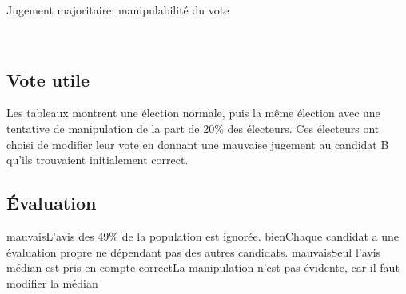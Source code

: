 \documentclass[../report]{subfiles}
\begin{document}
  \begin{table}[H]
    \begin{center}
      \caption{Jugement majoritaire: manipulabilité du vote}%
      \label{fig:diff:jugmaj:caslim1}
      \\[1em]
    \end{center}
  \end{table}
  \subsection{Vote utile}

  Les tableaux  montrent une élection normale, puis la même élection avec une tentative
  de manipulation de la part de 20\% des électeurs. 
  Ces électeurs ont choisi de modifier leur vote en donnant une mauvaise jugement au candidat B qu'ils trouvaient 
  initialement correct.

  \subsection{Évaluation}
  \tabcritere%
    {mauvais}{L'avis des 49\% de la population est ignorée.}%
    {bien}{Chaque candidat a une évaluation propre ne dépendant pas des autres candidats.}%
    {mauvais}{Seul l'avis médian est pris en compte}%
    {correct}{La manipulation n'est pas évidente, car il faut modifier la médian}
\end{document}
